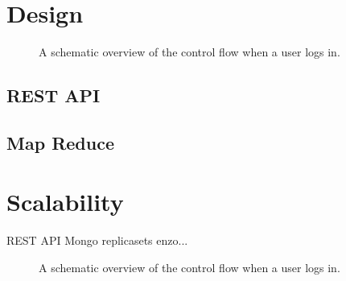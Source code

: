 \section{Design}

\begin{figure}
	\caption{A schematic overview of the control flow when a user logs in.}
	\label{fig:2:overview_backend}
\end{figure}

\subsection{REST API}

\subsection{Map Reduce}

\section{Scalability}
REST API
Mongo replicasets enzo...

\begin{figure}
	\caption{A schematic overview of the control flow when a user logs in.}
	\label{fig:2:overview_backend}
\end{figure}
